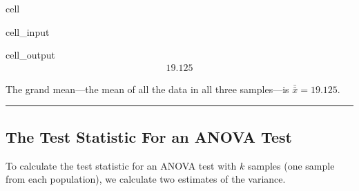 \documentclass[letterpaper,10pt,english]{jupyterBook}
\begin{document}
\begin{sphinxuseclass}{cell}\begin{sphinxVerbatimInput}

\begin{sphinxuseclass}{cell_input}
\begin{sphinxVerbatim}[commandchars=\\\{\}]
\end{sphinxVerbatim}

\end{sphinxuseclass}\end{sphinxVerbatimInput}
\begin{sphinxVerbatimOutput}

\begin{sphinxuseclass}{cell_output}\begin{equation*}
\begin{split}19.125\end{split}
\end{equation*}
\end{sphinxuseclass}\end{sphinxVerbatimOutput}

\end{sphinxuseclass}
\sphinxAtStartPar
The grand mean—the mean of all the data in all three samples—is \(\bar{\bar{x}} = 19.125\).


\bigskip\hrule\bigskip



\subsection{The Test Statistic For an ANOVA Test}
\label{\detokenize{Ch9 Hypothesis Tests of Two or More Populations/9.3 ANOVA:the-test-statistic-for-an-anova-test}}
\sphinxAtStartPar
To calculate the test statistic for an ANOVA test with \(k\) samples (one sample from each population), we calculate two estimates of the variance.
\end{document}
